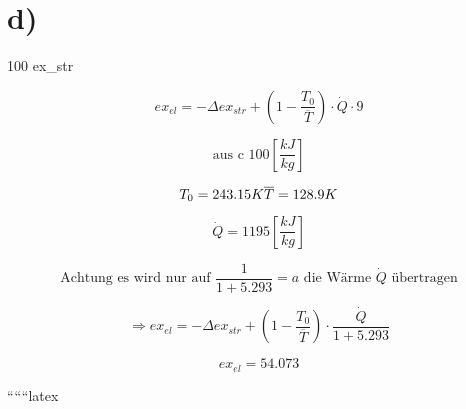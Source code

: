 

\section*{d)}

 100   \Delta ex_{str}

\[
ex_{el} = -\Delta ex_{str} + \left( 1 - \frac{T_0}{\overline{T}} \right) \cdot \dot{Q} \cdot 9
\]

\[
\text{aus c } 100 \left[ \frac{kJ}{kg} \right]
\]

\[
T_0 = 243.15 K \\
\overline{T} = 128.9 K
\]

\[
\dot{Q} = 1195 \left[ \frac{kJ}{kg} \right]
\]

\[
\text{Achtung es wird nur auf } \frac{1}{1 + 5.293} = a \text{ die W\"arme } \dot{Q} \text{ \"ubertragen}
\]

\[
\Rightarrow ex_{el} = -\Delta ex_{str} + \left( 1 - \frac{T_0}{\overline{T}} \right) \cdot \frac{\dot{Q}}{1 + 5.293}
\]

\[
\boxed{ex_{el} = 54.073}
\]

``````latex